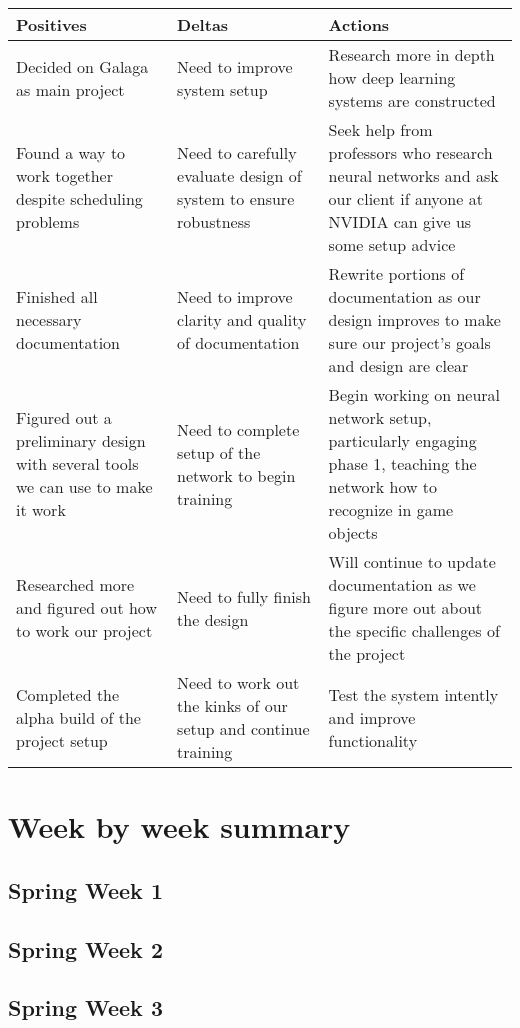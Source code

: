 \documentclass[onecolumn, draftclsnofoot,10pt, compsoc]{IEEEtran}
\begin{document}
\begin{center}
\begin{tabu} to 0.9\linewidth{ || X[l] | X[l] | X[l] || }
	\hline
	Positives & Deltas & Actions \\
	\hline\hline
	Decided on Galaga as main project & Need to improve system setup & Research more in depth how deep learning systems are constructed \\ \hline
	Found a way to work together despite scheduling problems & Need to carefully evaluate design of system to ensure robustness & Seek help from professors who research neural networks and ask our client if anyone at NVIDIA can give us some setup advice \\ \hline
	Finished all necessary documentation & Need to improve clarity and quality of documentation & Rewrite portions of documentation as our design improves to make sure our project's goals and design are clear \\ \hline
	Figured out a preliminary design with several tools we can use to make it work & Need to complete setup of the network to begin training & Begin working on neural network setup, particularly engaging phase 1, teaching the network how to recognize in game objects \\ \hline
	Researched more and figured out how to work our project & Need to fully finish the design & Will continue to update documentation as we figure more out about the specific challenges of the project \\ \hline
	Completed the alpha build of the project setup & Need to work out the kinks of our setup and continue training & Test the system intently and improve functionality \\ \hline
\end{tabu}
\end{center}

\section{Week by week summary}

\subsection{Spring Week 1}

\subsection{Spring Week 2}

\subsection{Spring Week 3}
\end{document}
